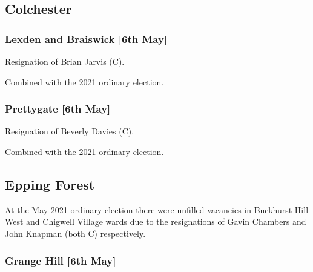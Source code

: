 \documentclass[a4paper,openany]{book}
\begin{document}
\begin{resultsiii}
\subsection*{Colchester}

\subsubsection*{Lexden and Braiswick \hspace*{\fill}\nolinebreak[1]%
	\enspace\hspace*{\fill}
	[6th May]}


Resignation of Brian Jarvis (C).

Combined with the 2021 ordinary election.

\subsubsection*{Prettygate \hspace*{\fill}\nolinebreak[1]%
	\enspace\hspace*{\fill}
	[6th May]}


Resignation of Beverly Davies (C).

Combined with the 2021 ordinary election.

\subsection*{Epping Forest}

At the May 2021 ordinary election there were unfilled vacancies in Buckhurst Hill West and Chigwell Village wards due to the resignations of Gavin Chambers and John Knapman (both C) respectively.

\subsubsection*{Grange Hill \hspace*{\fill}\nolinebreak[1]%
	\enspace\hspace*{\fill}
	[6th May]}


\end{resultsiii}
\end{document}
